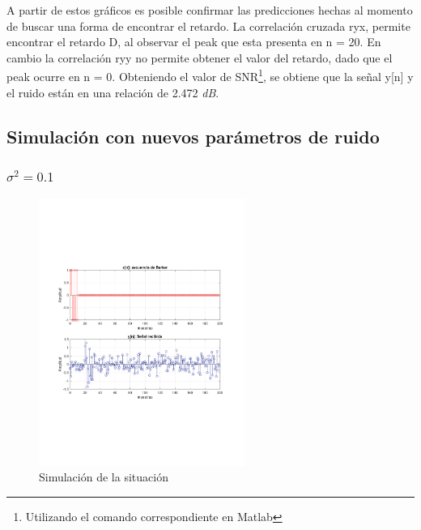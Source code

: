 		A partir de estos gráficos es posible confirmar las predicciones hechas al momento de buscar una forma de encontrar el retardo. La correlación cruzada ryx, permite encontrar el retardo D, al observar el peak que esta presenta en n = 20. En cambio la correlación ryy no permite obtener el valor del retardo, dado que el peak ocurre en n = 0. Obteniendo el valor de SNR\footnote{Utilizando el comando correspondiente en Matlab}, se obtiene que la señal y[n] y el ruido están en una relación de 2.472 \textit{dB}. 
		
	 \subsection{Simulación con nuevos parámetros de ruido}
	 	\subsubsection{$\sigma^{2} = 0.1$}
	 		\begin{figure}[H]
			\center
			\includegraphics[width=0.6\textwidth,clip, trim = {2cm 7.0cm 2.2cm 7.0cm}]{../imgs/4_radar_d_0_1_signal.pdf}
			\caption{Simulación de la situación}
			\label{fig:radar_d_0_1_sim}
			\end{figure}	
			
